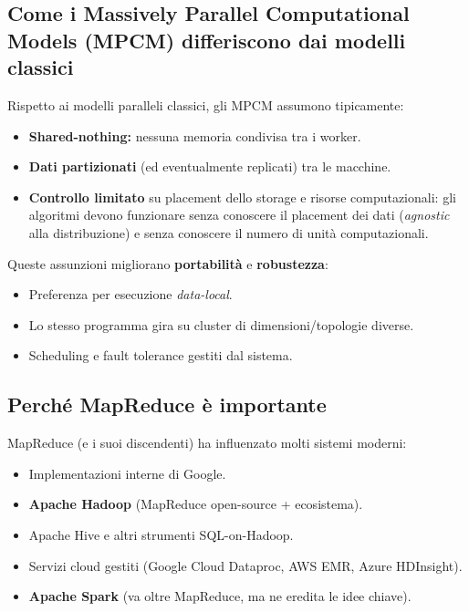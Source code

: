 \subsection{Come i Massively Parallel Computational Models (MPCM) differiscono
  dai modelli classici}

Rispetto ai modelli paralleli classici, gli MPCM assumono tipicamente:
\begin{itemize}
  \item \textbf{Shared-nothing:} nessuna memoria condivisa tra i worker.
  \item \textbf{Dati partizionati} (ed eventualmente replicati) tra le macchine.
  \item \textbf{Controllo limitato} su placement dello storage e risorse
    computazionali: gli algoritmi devono funzionare senza conoscere il
    placement dei dati (\emph{agnostic} alla distribuzione) e senza conoscere
    il numero di unità computazionali.
\end{itemize}

Queste assunzioni migliorano \textbf{portabilità} e \textbf{robustezza}:
\begin{itemize}
  \item Preferenza per esecuzione \emph{data-local}.
  \item Lo stesso programma gira su cluster di dimensioni/topologie diverse.
  \item Scheduling e fault tolerance gestiti dal sistema.
\end{itemize}

\subsection{Perché MapReduce è importante}

MapReduce (e i suoi discendenti) ha influenzato molti sistemi moderni:
\begin{itemize}
  \item Implementazioni interne di Google.
  \item \textbf{Apache Hadoop} (MapReduce open-source + ecosistema).
  \item Apache Hive e altri strumenti SQL-on-Hadoop.
  \item Servizi cloud gestiti (Google Cloud Dataproc, AWS EMR, Azure HDInsight).
  \item \textbf{Apache Spark} (va oltre MapReduce, ma ne eredita le idee chiave).
\end{itemize}

